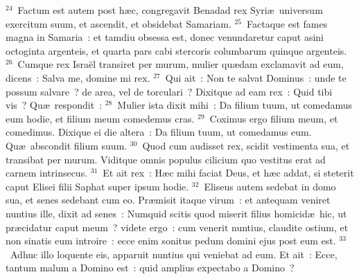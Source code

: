 ${}^{24}$~Factum est autem post h\ae c, congregavit Benadad rex Syri\ae\ universum exercitum suum, et ascendit, et obsidebat Samariam.
${}^{25}$~Factaque est fames magna in Samaria~: et tamdiu obsessa est, donec venundaretur caput asini octoginta argenteis, et quarta pars cabi stercoris columbarum quinque argenteis.
${}^{26}$~Cumque rex Isra\"el transiret per murum, mulier qu\ae dam exclamavit ad eum, dicens~: Salva me, domine mi rex.
${}^{27}$~Qui ait~: Non te salvat Dominus~: unde te possum salvare~? de area, vel de torculari~? Dixitque ad eam rex~: Quid tibi vis~? Qu\ae\ respondit~:
${}^{28}$~Mulier ista dixit mihi~: Da filium tuum, ut comedamus eum hodie, et filium meum comedemus cras.
${}^{29}$~Coximus ergo filium meum, et comedimus. Dixique ei die altera~: Da filium tuum, ut comedamus eum. Qu\ae\ abscondit filium suum.
${}^{30}$~Quod cum audisset rex, scidit vestimenta sua, et transibat per murum. Viditque omnis populus cilicium quo vestitus erat ad carnem intrinsecus.
${}^{31}$~Et ait rex~: H\ae c mihi faciat Deus, et h\ae c addat, si steterit caput Elisei filii Saphat super ipsum hodie.
${}^{32}$~Eliseus autem sedebat in domo sua, et senes sedebant cum eo. Pr\ae misit itaque virum~: et antequam veniret nuntius ille, dixit ad senes~: Numquid scitis quod miserit filius homicid\ae\ hic, ut pr\ae cidatur caput meum~? videte ergo~: cum venerit nuntius, claudite ostium, et non sinatis eum introire~: ecce enim sonitus pedum domini ejus post eum est.
${}^{33}$~Adhuc illo loquente eis, apparuit nuntius qui veniebat ad eum. Et ait~: Ecce, tantum malum a Domino est~: quid amplius expectabo a Domino~?

